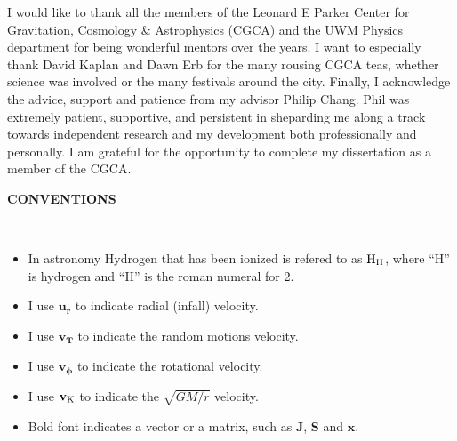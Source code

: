 \documentclass[12pt,notitlepage]{report}
\newcommand{\ur}{\mathbf{u_r}}
\newcommand{\vt}{\mathbf{v_T}}
\newcommand{\vkep}{\mathbf{v_{\rm K}}}
\newcommand{\vphi}{\mathbf{v_\phi}}
\newcommand{\HII}{{\rm H}_{\rm II}}
\begin{document}
%
I would like to thank all the members of the Leonard E Parker Center for Gravitation, Cosmology \& Astrophysics (CGCA) and the UWM Physics department for being wonderful mentors over the years. I want to especially thank David Kaplan and Dawn Erb for the many rousing CGCA teas, whether science was involved or the many festivals around the city.
Finally, I acknowledge the advice, support and patience from my advisor Philip Chang. 
Phil was extremely patient, supportive, and persistent in sheparding me along a track towards independent research 
and my development both professionally and personally.
I am grateful for the opportunity to complete my dissertation as a member of the CGCA.

\newpage

\begin{center}
{\Large \bf CONVENTIONS}
\end{center}
\ \\

\begin{itemize} 

\item In astronomy Hydrogen that has been ionized is refered to as $\HII$, where ``H'' is hydrogen and ``II'' is the roman numeral for 2. 

\item I use $\ur$ to indicate radial (infall) velocity.

\item I use $\vt$ to indicate the random motions velocity.

\item I use $\vphi$ to indicate the rotational velocity.

\item I use $\vkep$ to indicate the $\sqrt{GM/r}$ velocity.

\item Bold font indicates a vector or a matrix, such as $\mathbf{J}$, $\mathbf{S}$ and $\mathbf{x}$.

\end{itemize}
\end{document}
